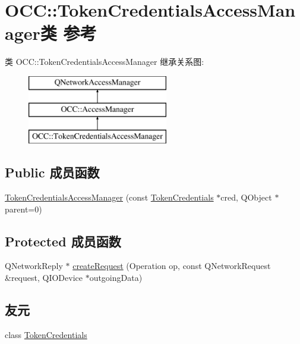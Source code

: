 \hypertarget{class_o_c_c_1_1_token_credentials_access_manager}{}\section{O\+CC\+:\+:Token\+Credentials\+Access\+Manager类 参考}
\label{class_o_c_c_1_1_token_credentials_access_manager}
类 O\+CC\+:\+:Token\+Credentials\+Access\+Manager 继承关系图\+:\begin{figure}[H]
\begin{center}
\leavevmode
\includegraphics[height=3.000000cm]{class_o_c_c_1_1_token_credentials_access_manager}
\end{center}
\end{figure}
\subsection*{Public 成员函数}
\begin{DoxyCompactItemize}
\item 
\hyperlink{class_o_c_c_1_1_token_credentials_access_manager_adb182793440bec9012d9dd42906d2565}{Token\+Credentials\+Access\+Manager} (const \hyperlink{class_o_c_c_1_1_token_credentials}{Token\+Credentials} $\ast$cred, Q\+Object $\ast$parent=0)
\end{DoxyCompactItemize}
\subsection*{Protected 成员函数}
\begin{DoxyCompactItemize}
\item 
Q\+Network\+Reply $\ast$ \hyperlink{class_o_c_c_1_1_token_credentials_access_manager_afb0af59af23cc25e41f3b2773c4e261d}{create\+Request} (Operation op, const Q\+Network\+Request \&request, Q\+I\+O\+Device $\ast$outgoing\+Data)
\end{DoxyCompactItemize}
\subsection*{友元}
\begin{DoxyCompactItemize}
\item 
class \hyperlink{class_o_c_c_1_1_token_credentials_access_manager_a6ed8b3b5b5b5a9472b9bb5600a47b904}{Token\+Credentials}
\end{DoxyCompactItemize}


